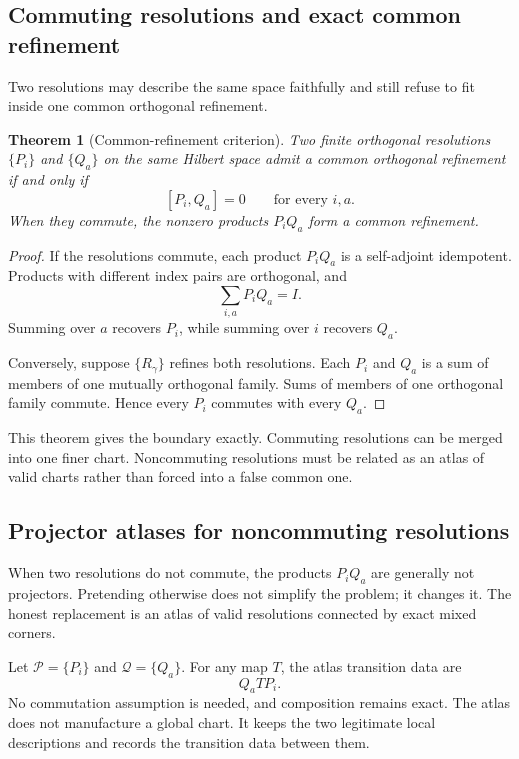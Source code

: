 \documentclass[11pt]{article}
\newtheorem{theorem}{Theorem}[section]
\theoremstyle{definition}
\theoremstyle{remark}
\begin{document}
\subsection{Commuting resolutions and exact common refinement}

Two resolutions may describe the same space faithfully and still refuse to fit inside one common orthogonal refinement.

\begin{theorem}[Common-refinement criterion]
Two finite orthogonal resolutions \(\{P_i\}\) and \(\{Q_a\}\) on the same Hilbert space admit a common orthogonal refinement if and only if
\[
[P_i,Q_a]=0
\qquad\text{for every }i,a.
\]
When they commute, the nonzero products \(P_iQ_a\) form a common refinement.
\end{theorem}

\begin{proof}
If the resolutions commute, each product \(P_iQ_a\) is a self-adjoint idempotent.  Products with different index pairs are orthogonal, and
\[
\sum_{i,a}P_iQ_a=I.
\]
Summing over \(a\) recovers \(P_i\), while summing over \(i\) recovers \(Q_a\).

Conversely, suppose \(\{R_\gamma\}\) refines both resolutions.  Each \(P_i\) and \(Q_a\) is a sum of members of one mutually orthogonal family.  Sums of members of one orthogonal family commute.  Hence every \(P_i\) commutes with every \(Q_a\).
\end{proof}

This theorem gives the boundary exactly.  Commuting resolutions can be merged into one finer chart.  Noncommuting resolutions must be related as an atlas of valid charts rather than forced into a false common one.

\subsection{Projector atlases for noncommuting resolutions}

When two resolutions do not commute, the products \(P_iQ_a\) are generally not projectors.  Pretending otherwise does not simplify the problem; it changes it.  The honest replacement is an atlas of valid resolutions connected by exact mixed corners.

Let \(\mathcal P=\{P_i\}\) and \(\mathcal Q=\{Q_a\}\).  For any map \(T\), the atlas transition data are
\[
Q_aTP_i.
\]
No commutation assumption is needed, and composition remains exact.  The atlas does not manufacture a global chart.  It keeps the two legitimate local descriptions and records the transition data between them.
\end{document}
